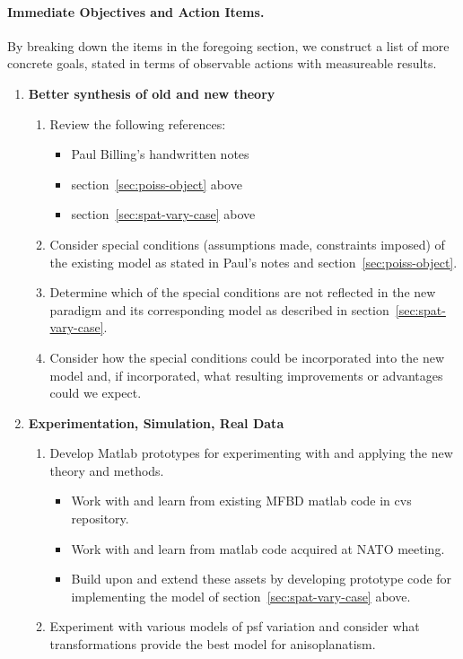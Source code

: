 \paragraph{Immediate Objectives and Action Items.} By breaking down the items
in the foregoing section, we construct a list of more concrete goals, stated
in terms of observable actions with measureable results. 
\begin{enumerate}
\item {\bf Better synthesis of old and new theory}
\begin{enumerate}
\item Review the following references:
\begin{itemize}
\item Paul Billing's handwritten notes\label{item:revref1}
\item section~\ref{sec:poiss-object} above
\item section~\ref{sec:spat-vary-case} above
\end{itemize}
\item Consider special conditions (\eg assumptions made, constraints imposed)
  of the existing model as stated in Paul's notes and section~\ref{sec:poiss-object}.
\item Determine which of the special conditions are not reflected in the new paradigm
 and its corresponding model as described in section~\ref{sec:spat-vary-case}.
\item Consider how the special conditions could be incorporated into the new
  model and, if incorporated, what resulting improvements or advantages could
  we expect.
\end{enumerate}
\item {\bf Experimentation, Simulation, Real Data}
\begin{enumerate}
\item Develop Matlab prototypes for experimenting with and applying the new theory and methods. 
\begin{itemize}
\item Work with and learn from existing MFBD matlab code in cvs repository.
\item Work with and learn from matlab code acquired at NATO meeting.
\item Build upon and extend these assets by developing prototype code for
  implementing the model of section~\ref{sec:spat-vary-case} above. 
\end{itemize}
\item Experiment with various models of psf variation and consider what
  transformations provide the best model for anisoplanatism. 
\end{enumerate}
\end{enumerate}

